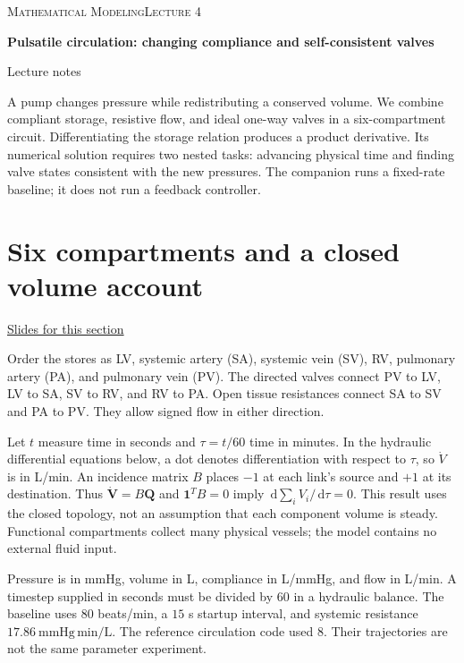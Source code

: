 \documentclass[11pt,letterpaper]{article}
\providecommand{\dd}{\,\mathrm{d}}\providecommand{\R}{\mathbb{R}}
\theoremstyle{definition}\newtheorem{definition}{Definition}\newtheorem{example}{Example}
\numberwithin{equation}{section}
\begin{document}
{\small\scshape Mathematical Modeling\hfill Lecture 4}\par\medskip
{\raggedright{}\LARGE\bfseries\color{ink} Pulsatile circulation: changing compliance and self-consistent valves\par}\medskip
{\small Lecture notes}\par\bigskip
A pump changes pressure while redistributing a conserved volume. We combine compliant storage, resistive flow, and ideal one-way valves in a six-compartment circuit. Differentiating the storage relation produces a product derivative. Its numerical solution requires two nested tasks: advancing physical time and finding valve states consistent with the new pressures. The companion runs a fixed-rate baseline; it does not run a feedback controller.

\section{Six compartments and a closed volume account}
\hypertarget{note-six-compartments-and-a-closed-volume-account}{}\label{note:six-compartments-and-a-closed-volume-account}
{\small \href{slides.html\#frame=conservation-storage-and-link-laws\&step=1}{Slides for this section}}\par
Order the stores as LV, systemic artery (SA), systemic vein (SV), RV, pulmonary artery (PA), and pulmonary vein (PV). The directed valves connect PV to LV, LV to SA, SV to RV, and RV to PA. Open tissue resistances connect SA to SV and PA to PV. They allow signed flow in either direction.

Let $t$ measure time in seconds and $\tau=t/60$ time in minutes. In the hydraulic differential equations below, a dot denotes differentiation with respect to $\tau$, so $\dot V$ is in L/min. An incidence matrix $B$ places $-1$ at each link's source and $+1$ at its destination. Thus $\dot{\mathbf V}=B\mathbf Q$ and $\mathbf1^TB=0$ imply $\dd\sum_iV_i/\dd\tau=0$. This result uses the closed topology, not an assumption that each component volume is steady. Functional compartments collect many physical vessels; the model contains no external fluid input.

Pressure is in mmHg, volume in L, compliance in L/mmHg, and flow in L/min. A timestep supplied in seconds must be divided by $60$ in a hydraulic balance. The baseline uses $80$ beats/min, a $15$ s startup interval, and systemic resistance $17.86\ \mathrm{mmHg}\,\mathrm{min}/\mathrm L$. The reference circulation code used $8$. Their trajectories are not the same parameter experiment.
\end{document}
